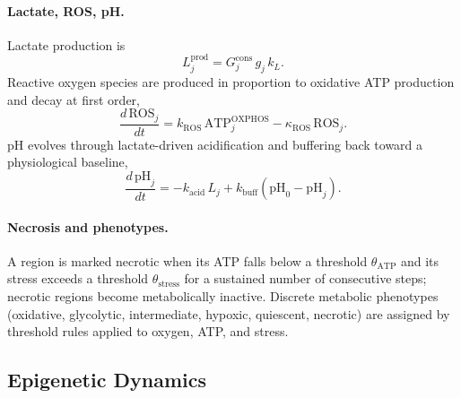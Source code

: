 \documentclass[12pt,a4paper]{article}
\begin{document}
\paragraph{Lactate, ROS, pH.}
Lactate production is
\begin{equation}
L_j^{\mathrm{prod}} = G_j^{\mathrm{cons}} \, g_j \, k_L.
\end{equation}
Reactive oxygen species are produced in proportion to oxidative ATP production and decay at first order,
\begin{equation}
\frac{d\,\mathrm{ROS}_j}{dt} = k_{\mathrm{ROS}} \,\mathrm{ATP}_j^{\mathrm{OXPHOS}} - \kappa_{\mathrm{ROS}} \,\mathrm{ROS}_j.
\end{equation}
pH evolves through lactate-driven acidification and buffering back toward a physiological baseline,
\begin{equation}
\frac{d\,\mathrm{pH}_j}{dt} = -k_{\mathrm{acid}}\,L_j + k_{\mathrm{buff}}\left(\mathrm{pH}_0 - \mathrm{pH}_j\right).
\end{equation}

\paragraph{Necrosis and phenotypes.}
A region is marked necrotic when its ATP falls below a threshold $\theta_{\mathrm{ATP}}$ and its stress exceeds a threshold $\theta_{\mathrm{stress}}$ for a sustained number of consecutive steps; necrotic regions become metabolically inactive. Discrete metabolic phenotypes (oxidative, glycolytic, intermediate, hypoxic, quiescent, necrotic) are assigned by threshold rules applied to oxygen, ATP, and stress.

\subsection{Epigenetic Dynamics}
\end{document}
